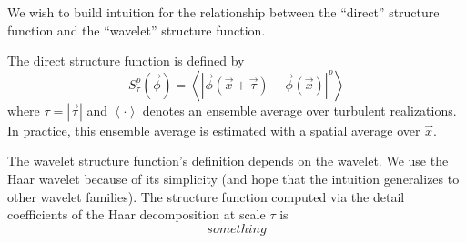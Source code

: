 \documentclass{article}
\begin{document}

We wish to build intuition for the relationship between the ``direct'' structure function and the ``wavelet'' structure function.

The direct structure function is defined by
\begin{equation}
    S^p_\tau(\vec{\phi}) = \left< \left| \vec{\phi}(\vec{x} + \vec{\tau}) - \vec{\phi}(\vec{x}) \right|^p \right>
\end{equation}
where $\tau = |\vec{\tau}|$ and $\left< \cdot \right>$ denotes an ensemble average over turbulent realizations.
In practice, this ensemble average is estimated with a spatial average over $\vec{x}$.

The wavelet structure function's definition depends on the wavelet.
We use the Haar wavelet because of its simplicity (and hope that the intuition generalizes to other wavelet families).
The structure function computed via the detail coefficients of the Haar decomposition at scale $\tau$ is
\begin{equation}
    something
\end{equation}

\end{document}
